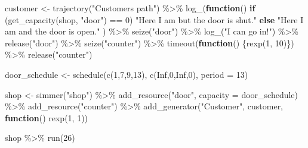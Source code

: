 \documentclass[
]{book}
\newenvironment{Shaded}{\begin{snugshade}}{\end{snugshade}}
\newcommand{\AttributeTok}[1]{\textcolor[rgb]{0.77,0.63,0.00}{#1}}
\newcommand{\ConstantTok}[1]{\textcolor[rgb]{0.00,0.00,0.00}{#1}}
\newcommand{\ControlFlowTok}[1]{\textcolor[rgb]{0.13,0.29,0.53}{\textbf{#1}}}
\newcommand{\DecValTok}[1]{\textcolor[rgb]{0.00,0.00,0.81}{#1}}
\newcommand{\FunctionTok}[1]{\textcolor[rgb]{0.00,0.00,0.00}{#1}}
\newcommand{\NormalTok}[1]{#1}
\newcommand{\OtherTok}[1]{\textcolor[rgb]{0.56,0.35,0.01}{#1}}
\newcommand{\SpecialCharTok}[1]{\textcolor[rgb]{0.00,0.00,0.00}{#1}}
\newcommand{\StringTok}[1]{\textcolor[rgb]{0.31,0.60,0.02}{#1}}
\begin{document}
\begin{Shaded}
\begin{Highlighting}[]
\NormalTok{customer }\OtherTok{\textless{}{-}}
  \FunctionTok{trajectory}\NormalTok{(}\StringTok{"Customer\textquotesingle{}s path"}\NormalTok{) }\SpecialCharTok{\%\textgreater{}\%}
  \FunctionTok{log\_}\NormalTok{(}\ControlFlowTok{function}\NormalTok{()}
    \ControlFlowTok{if}\NormalTok{ (}\FunctionTok{get\_capacity}\NormalTok{(shop, }\StringTok{"door"}\NormalTok{) }\SpecialCharTok{==} \DecValTok{0}\NormalTok{)}
      \StringTok{"Here I am but the door is shut."}
    \ControlFlowTok{else} \StringTok{"Here I am and the door is open."}
\NormalTok{  ) }\SpecialCharTok{\%\textgreater{}\%}
  \FunctionTok{seize}\NormalTok{(}\StringTok{"door"}\NormalTok{) }\SpecialCharTok{\%\textgreater{}\%}
  \FunctionTok{log\_}\NormalTok{(}\StringTok{"I can go in!"}\NormalTok{) }\SpecialCharTok{\%\textgreater{}\%}
  \FunctionTok{release}\NormalTok{(}\StringTok{"door"}\NormalTok{) }\SpecialCharTok{\%\textgreater{}\%}
  \FunctionTok{seize}\NormalTok{(}\StringTok{"counter"}\NormalTok{) }\SpecialCharTok{\%\textgreater{}\%}
  \FunctionTok{timeout}\NormalTok{(}\ControlFlowTok{function}\NormalTok{() \{}\FunctionTok{rexp}\NormalTok{(}\DecValTok{1}\NormalTok{, }\DecValTok{10}\NormalTok{)\}) }\SpecialCharTok{\%\textgreater{}\%}
  \FunctionTok{release}\NormalTok{(}\StringTok{"counter"}\NormalTok{)}

\NormalTok{door\_schedule }\OtherTok{\textless{}{-}} \FunctionTok{schedule}\NormalTok{(}\FunctionTok{c}\NormalTok{(}\DecValTok{1}\NormalTok{,}\DecValTok{7}\NormalTok{,}\DecValTok{9}\NormalTok{,}\DecValTok{13}\NormalTok{), }\FunctionTok{c}\NormalTok{(}\ConstantTok{Inf}\NormalTok{,}\DecValTok{0}\NormalTok{,}\ConstantTok{Inf}\NormalTok{,}\DecValTok{0}\NormalTok{), }\AttributeTok{period =} \DecValTok{13}\NormalTok{)}

\NormalTok{shop }\OtherTok{\textless{}{-}}
  \FunctionTok{simmer}\NormalTok{(}\StringTok{"shop"}\NormalTok{) }\SpecialCharTok{\%\textgreater{}\%}
  \FunctionTok{add\_resource}\NormalTok{(}\StringTok{"door"}\NormalTok{, }\AttributeTok{capacity =}\NormalTok{ door\_schedule) }\SpecialCharTok{\%\textgreater{}\%}
  \FunctionTok{add\_resource}\NormalTok{(}\StringTok{"counter"}\NormalTok{) }\SpecialCharTok{\%\textgreater{}\%}
  \FunctionTok{add\_generator}\NormalTok{(}\StringTok{"Customer"}\NormalTok{, customer, }\ControlFlowTok{function}\NormalTok{() }\FunctionTok{rexp}\NormalTok{(}\DecValTok{1}\NormalTok{, }\DecValTok{1}\NormalTok{))}

\NormalTok{shop }\SpecialCharTok{\%\textgreater{}\%} \FunctionTok{run}\NormalTok{(}\DecValTok{26}\NormalTok{)}
\end{Highlighting}
\end{Shaded}
\end{document}
